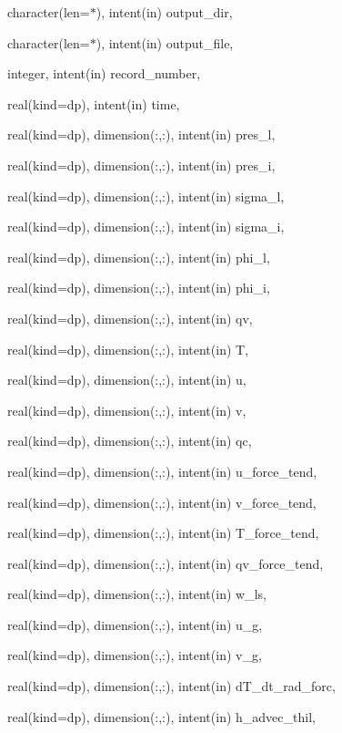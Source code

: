 {\begin{DoxyParamCaption}
\item[{character(len=$\ast$), intent(in)}]{output\+\_\+dir, }
\item[{character(len=$\ast$), intent(in)}]{output\+\_\+file, }
\item[{integer, intent(in)}]{record\+\_\+number, }
\item[{real(kind=dp), intent(in)}]{time, }
\item[{real(kind=dp), dimension(\+:,\+:), intent(in)}]{pres\+\_\+l, }
\item[{real(kind=dp), dimension(\+:,\+:), intent(in)}]{pres\+\_\+i, }
\item[{real(kind=dp), dimension(\+:,\+:), intent(in)}]{sigma\+\_\+l, }
\item[{real(kind=dp), dimension(\+:,\+:), intent(in)}]{sigma\+\_\+i, }
\item[{real(kind=dp), dimension(\+:,\+:), intent(in)}]{phi\+\_\+l, }
\item[{real(kind=dp), dimension(\+:,\+:), intent(in)}]{phi\+\_\+i, }
\item[{real(kind=dp), dimension(\+:,\+:), intent(in)}]{qv, }
\item[{real(kind=dp), dimension(\+:,\+:), intent(in)}]{T, }
\item[{real(kind=dp), dimension(\+:,\+:), intent(in)}]{u, }
\item[{real(kind=dp), dimension(\+:,\+:), intent(in)}]{v, }
\item[{real(kind=dp), dimension(\+:,\+:), intent(in)}]{qc, }
\item[{real(kind=dp), dimension(\+:,\+:), intent(in)}]{u\+\_\+force\+\_\+tend, }
\item[{real(kind=dp), dimension(\+:,\+:), intent(in)}]{v\+\_\+force\+\_\+tend, }
\item[{real(kind=dp), dimension(\+:,\+:), intent(in)}]{T\+\_\+force\+\_\+tend, }
\item[{real(kind=dp), dimension(\+:,\+:), intent(in)}]{qv\+\_\+force\+\_\+tend, }
\item[{real(kind=dp), dimension(\+:,\+:), intent(in)}]{w\+\_\+ls, }
\item[{real(kind=dp), dimension(\+:,\+:), intent(in)}]{u\+\_\+g, }
\item[{real(kind=dp), dimension(\+:,\+:), intent(in)}]{v\+\_\+g, }
\item[{real(kind=dp), dimension(\+:,\+:), intent(in)}]{d\+T\+\_\+dt\+\_\+rad\+\_\+forc, }
\item[{real(kind=dp), dimension(\+:,\+:), intent(in)}]{h\+\_\+advec\+\_\+thil, }

\end{DoxyParamCaption}}
